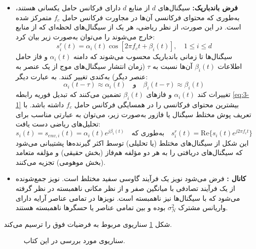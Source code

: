 \begin{itemize}
	\item \textbf{فرض باندباریک:} سیگنال‌های $d$ از منابع $d$ دارای فرکانس حامل یکسانی هستند، به‌طوری که محتوای فرکانسی آن‌ها در مجاورت فرکانس حامل $f_c$ متمرکز شده است. در این صورت، از نظر ریاضی، هر یک از سیگنال‌های لحظه‌ای که از منابع خارج می‌شوند را می‌توان به‌صورت زیر بیان کرد:
	\begin{equation}
		s_i^r(t) = \alpha_i(t) \cos[2\pi f_c t + \beta_i(t)], \quad 1 \leq i \leq d
		\label{eq:3-1}
	\end{equation}
	سیگنال‌ها تا زمانی باندباریک محسوب می‌شوند که دامنه $\alpha_i(t)$ و فاز حامل اطلاعات $\beta_i(t)$ آن‌ها نسبت به $\tau$ (زمان انتشار سیگنال‌های موج از یک عنصر به عنصر دیگر) به‌کندی تغییر کنند. به عبارت دیگر:
	\begin{equation}
		\alpha_i(t - \tau) \approx \alpha_i(t) \quad \text{و} \quad \beta_i(t - \tau) \approx \beta_i(t)
		\label{eq:3-2}
	\end{equation}
	تغییرات کند $\alpha_i(t)$ و فازهای $\beta_i(t)$ تضمین می‌کنند که تبدیل فوریه رابطه \eqref{eq:3-1} بیشترین محتوای فرکانسی را در همسایگی فرکانس حامل $f_c$ داشته باشد. با تعریف پوش مختلط سیگنال یا فازور به‌صورت زیر، می‌توان به عبارتی مناسب برای تحلیل‌های ریاضی دست یافت:
	\begin{equation}
		s_i(t) = s_{env, i}(t) = \alpha_i(t) e^{j\beta_i(t)} \quad \text{به‌طوری که} \quad s_i^r(t) = \text{Re}\{s_i(t) e^{j 2\pi f_c t}\}
		\label{eq:3-3}
	\end{equation}
	این شکل از سیگنال‌های مختلط (یا تحلیلی) توسط اکثر گیرنده‌ها پشتیبانی می‌شود که سیگنال‌های دریافتی را به هر دو مؤلفه هم‌فاز (بخش حقیقی) و مؤلفه متعامد (بخش موهومی) تجزیه می‌کنند.
	
	\item \textbf{کانال :} فرض می‌شود نویز یک فرآیند گاوسی سفید مختلط است. نویز جمع‌شونده از یک فرآیند تصادفی با میانگین صفر و از نظر مکانی ناهمبسته در نظر گرفته می‌شود که با سیگنال‌ها نیز ناهمبسته است. نویزها در تمامی عناصر آرایه دارای واریانس مشترک $\sigma_N^2$ بوده و بین تمامی عناصر یا حسگرها ناهمبسته هستند.
\end{itemize}

شکل \ref{fig:3-1} سناریوی مربوط به فرضیات فوق را ترسیم می‌کند.


\begin{figure}[ht]
	\centering
	\caption{سناریوی مورد بررسی در این کتاب.}
	\label{fig:3-1}
\end{figure}


